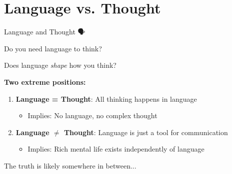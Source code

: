\documentclass[aspectratio=169]{beamer}
\begin{document}
\section{Language vs. Thought}

\begin{frame}[shrink=10]{Language and Thought 🗣️💭}
\small
\begin{discussion}
Do you need language to think?

Does language \textit{shape} how you think?
\end{discussion}

\vspace{0.3cm}

\textbf{Two extreme positions:}
\begin{enumerate}\setlength{\itemsep}{0pt}
    \item \textbf{Language = Thought}: All thinking happens in language
    \begin{itemize}\setlength{\itemsep}{0pt}
        \item Implies: No language, no complex thought
    \end{itemize}
    \item \textbf{Language $\neq$ Thought}: Language is just a tool for communication
    \begin{itemize}\setlength{\itemsep}{0pt}
        \item Implies: Rich mental life exists independently of language
    \end{itemize}
\end{enumerate}

\vspace{0.3cm}

The truth is likely somewhere in between...
\end{frame}
\end{document}
